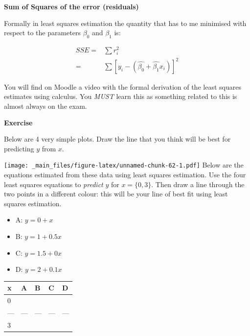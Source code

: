 \documentclass[
]{gitbook}
\providecommand{\tightlist}{%
  \setlength{\itemsep}{0pt}\setlength{\parskip}{0pt}}
\begin{document}
\textbf{Sum of Squares of the error (residuals)}

Formally in least squares estimation the quantity that has to me minimised with respect to the parameters \(\beta_0\) and \(\beta_1\) is:

\[
\begin{aligned}
SSE= &  \sum r_i^2  \\
 =  & \sum [y_i - (\hat{\beta_0}+\hat{\beta_1}x_i)]^2 
\end{aligned}
\]

You will find on Moodle a video with the formal derivation of the least squares estimates using calculus. You \emph{MUST} learn this as something related to this is almost always on the exam.

\newpage

\textbf{Exercise}

Below are 4 very simple plots. Draw the line that you think will be best for predicting \(y\) from \(x\).

\texttt{[image: \_main\_files/figure-latex/unnamed-chunk-62-1.pdf]}
Below are the equations estimated from these data using least squares estimation. Use the four least squares equations to \emph{predict} \(y\) for \(x= \{0,3\}\). Then draw a line through the two points in a different colour: this will be your line of best fit using least squares estimation.

\begin{itemize}
\tightlist
\item
  A: \(y = 0 + x\)
\item
  B: \(y = 1 + 0.5 x\)
\item
  C: \(y = 1.5 + 0 x\)
\item
  D: \(y = 2 + 0.1 x\)
\end{itemize}

\begin{longtable}[]{@{}lllll@{}}
\toprule()
x & A & B & C & D \\
\midrule()
\endhead
0 & & & & \\
--- & --- & --- & --- & --- \\
3 & & & & \\
\bottomrule()
\end{longtable}

\end{document}

